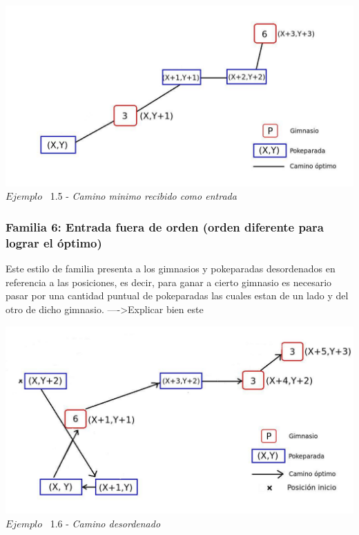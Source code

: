 \vspace*{0.3cm} \vspace*{0.3cm}
  \begin{center}
 \includegraphics[scale=0.6]{./EJ1/optima.jpeg}
\\ {$Ejemplo$ \ 1.5 - \textit{Camino minimo recibido como entrada}}
  \end{center}
  \vspace*{0.3cm}

\begin{center}
  \subsubsection*{Familia 6: Entrada fuera de orden (orden diferente para lograr el óptimo)}
\end{center}

Este estilo de familia presenta a los gimnasios y pokeparadas desordenados en referencia a las posiciones, es decir, para ganar a cierto gimnasio es necesario pasar por una cantidad puntual de pokeparadas las cuales estan de un lado y del otro de dicho gimnasio.
---->Explicar bien este

\vspace*{0.3cm} \vspace*{0.3cm}
  \begin{center}
 \includegraphics[scale=0.6]{./EJ1/desorden.jpeg}
\\ {$Ejemplo$ \ 1.6 - \textit{Camino desordenado}}
  \end{center}
  \vspace*{0.3cm}

